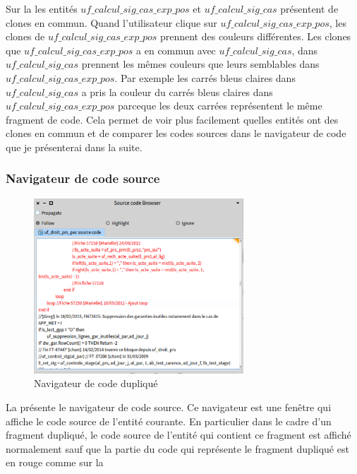 \documentclass[a4paper]{article}
\begin{document}
Sur la  les entités $uf\_calcul\_sig\_cas\_exp\_pos$ et $uf\_calcul\_sig\_cas$  présentent de clones en commun.
Quand l'utilisateur clique sur $uf\_calcul\_sig\_cas\_exp\_pos$, les clones de $uf\_calcul\_sig\_cas\_exp\_pos$ prennent des couleurs différentes.
Les clones que $uf\_calcul\_sig\_cas\_exp\_pos$ a en commun avec $uf\_calcul\_sig\_cas$, dans $uf\_calcul\_sig\_cas$ prennent les mêmes couleurs que leurs semblables dans $uf\_calcul\_sig\_cas\_exp\_pos$.
Par exemple les carrés bleus claires dans $uf\_calcul\_sig\_cas$ a pris la couleur du carrés bleus claires  dans $uf\_calcul\_sig\_cas\_exp\_pos$
parceque les deux carrées représentent le même fragment de code.  
Cela permet de voir plus facilement quelles entités ont des clones en commun et de comparer les codes sources dans le navigateur de code que je présenterai dans la suite. 

\subsubsection{Navigateur de code source}
\begin{figure}[htbp]
  \begin{center}
  \includegraphics[width=0.7\textwidth]{./figures/sourceCodeBrowser.png}
  \caption{Navigateur de code dupliqué}
  \label{fig:sourceCodeBrowser}
\end{center}
\vspace{-0.3cm}
\end{figure}
La  présente le navigateur de code source. 
Ce navigateur est une fenêtre qui affiche le code source de l'entité courante.
En particulier dans le cadre d'un fragment dupliqué, le code source de l'entité qui contient ce fragment est affiché normalement sauf que la partie du code qui représente le fragment dupliqué est en rouge comme sur la 
\end{document}
